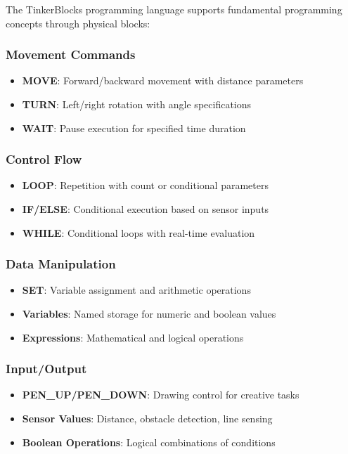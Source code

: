The TinkerBlocks programming language supports fundamental programming concepts through physical blocks:

\subsubsection{Movement Commands}
\begin{itemize}
    \item \textbf{MOVE}: Forward/backward movement with distance parameters
    \item \textbf{TURN}: Left/right rotation with angle specifications
    \item \textbf{WAIT}: Pause execution for specified time duration
\end{itemize}

\subsubsection{Control Flow}
\begin{itemize}
    \item \textbf{LOOP}: Repetition with count or conditional parameters
    \item \textbf{IF/ELSE}: Conditional execution based on sensor inputs
    \item \textbf{WHILE}: Conditional loops with real-time evaluation
\end{itemize}

\subsubsection{Data Manipulation}
\begin{itemize}
    \item \textbf{SET}: Variable assignment and arithmetic operations
    \item \textbf{Variables}: Named storage for numeric and boolean values
    \item \textbf{Expressions}: Mathematical and logical operations
\end{itemize}

\subsubsection{Input/Output}
\begin{itemize}
    \item \textbf{PEN\_UP/PEN\_DOWN}: Drawing control for creative tasks
    \item \textbf{Sensor Values}: Distance, obstacle detection, line sensing
    \item \textbf{Boolean Operations}: Logical combinations of conditions
\end{itemize}

